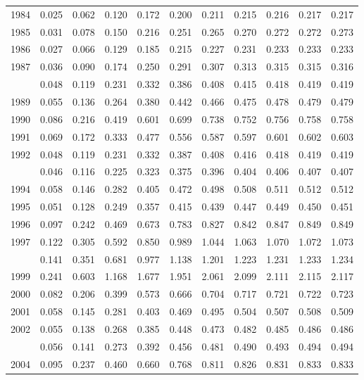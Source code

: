 \documentclass[
]{article}
\begin{document}
\begin{longtable}[t]{lrrrrrrrrrr}
1984 & 0.025 & 0.062 & 0.120 & 0.172 & 0.200 & 0.211 & 0.215 & 0.216 & 0.217 & 0.217\\
1985 & 0.031 & 0.078 & 0.150 & 0.216 & 0.251 & 0.265 & 0.270 & 0.272 & 0.272 & 0.273\\
1986 & 0.027 & 0.066 & 0.129 & 0.185 & 0.215 & 0.227 & 0.231 & 0.233 & 0.233 & 0.233\\
1987 & 0.036 & 0.090 & 0.174 & 0.250 & 0.291 & 0.307 & 0.313 & 0.315 & 0.315 & 0.316\\
\addlinespace
1988 & 0.048 & 0.119 & 0.231 & 0.332 & 0.386 & 0.408 & 0.415 & 0.418 & 0.419 & 0.419\\
1989 & 0.055 & 0.136 & 0.264 & 0.380 & 0.442 & 0.466 & 0.475 & 0.478 & 0.479 & 0.479\\
1990 & 0.086 & 0.216 & 0.419 & 0.601 & 0.699 & 0.738 & 0.752 & 0.756 & 0.758 & 0.758\\
1991 & 0.069 & 0.172 & 0.333 & 0.477 & 0.556 & 0.587 & 0.597 & 0.601 & 0.602 & 0.603\\
1992 & 0.048 & 0.119 & 0.231 & 0.332 & 0.387 & 0.408 & 0.416 & 0.418 & 0.419 & 0.419\\
\addlinespace
1993 & 0.046 & 0.116 & 0.225 & 0.323 & 0.375 & 0.396 & 0.404 & 0.406 & 0.407 & 0.407\\
1994 & 0.058 & 0.146 & 0.282 & 0.405 & 0.472 & 0.498 & 0.508 & 0.511 & 0.512 & 0.512\\
1995 & 0.051 & 0.128 & 0.249 & 0.357 & 0.415 & 0.439 & 0.447 & 0.449 & 0.450 & 0.451\\
1996 & 0.097 & 0.242 & 0.469 & 0.673 & 0.783 & 0.827 & 0.842 & 0.847 & 0.849 & 0.849\\
1997 & 0.122 & 0.305 & 0.592 & 0.850 & 0.989 & 1.044 & 1.063 & 1.070 & 1.072 & 1.073\\
\addlinespace
1998 & 0.141 & 0.351 & 0.681 & 0.977 & 1.138 & 1.201 & 1.223 & 1.231 & 1.233 & 1.234\\
1999 & 0.241 & 0.603 & 1.168 & 1.677 & 1.951 & 2.061 & 2.099 & 2.111 & 2.115 & 2.117\\
2000 & 0.082 & 0.206 & 0.399 & 0.573 & 0.666 & 0.704 & 0.717 & 0.721 & 0.722 & 0.723\\
2001 & 0.058 & 0.145 & 0.281 & 0.403 & 0.469 & 0.495 & 0.504 & 0.507 & 0.508 & 0.509\\
2002 & 0.055 & 0.138 & 0.268 & 0.385 & 0.448 & 0.473 & 0.482 & 0.485 & 0.486 & 0.486\\
\addlinespace
2003 & 0.056 & 0.141 & 0.273 & 0.392 & 0.456 & 0.481 & 0.490 & 0.493 & 0.494 & 0.494\\
2004 & 0.095 & 0.237 & 0.460 & 0.660 & 0.768 & 0.811 & 0.826 & 0.831 & 0.833 & 0.833\\

\end{longtable}
\end{document}
